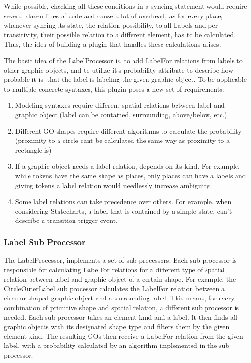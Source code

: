 While possible, checking all these conditions in a syncing statement would require several dozen lines of code and cause a lot of overhead, as for every place, whenever syncing its state, the relation possibility, to all Labels and per transitivity, their possible relation to a different element, has to be calculated. Thus, the idea of building a plugin that handles these calculations arises.

The basic idea of the LabelProcessor is, to add LabelFor relations from labels to other graphic objects, and to utilize it's probability attribute to describe how probable it is, that the label is labeling the given graphic object. To be applicable to multiple concrete syntaxes, this plugin poses a new set of requirements: 
\begin{enumerate}
  \item Modeling syntaxes require different spatial relations between label and graphic object (label can be contained, surrounding, above/below, etc.).
  \item Different GO shapes require different algorithms to calculate the probability (proximity to a circle cant be calculated the same way as proximity to a rectangle is)
  \item If a graphic object needs a label relation, depends on its kind. For example, while tokens have the same shape as places, only places can have a labels and giving tokens a label relation would needlessly increase ambiguity.
  \item Some label relations can take precedence over others. For example, when considering Statecharts, a label that is contained by a simple state, can't describe a transition trigger event.
\end{enumerate}

\subsubsection{Label Sub Processor}
The LabelProcessor, implements a set of sub processors. Each sub processor is responsible for calculating LabelFor relations for a different type of spatial relation between label and  graphic object of a certain shape. For example, the CircleOuterLabel sub processor calculates the LabelFor relation between a circular shaped graphic object and a surrounding label. This means, for every combination of primitive shape and spatial relation, a different sub processor is needed. Each sub processor takes an element kind and a label. It then finds all graphic objects with its designated shape type and filters them by the given element kind. The resulting GOs then receive a LabelFor relation from the given label, with a probability calculated by an algorithm implemented in the sub processor. 

